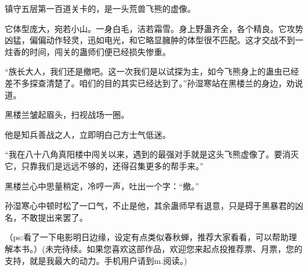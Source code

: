 \begin{this_body}
镇守五层第一百道关卡的，是一头荒兽飞熊的虚像。

它体型庞大，宛若小山。一身白毛，洁若霜雪。身上野蛊齐全，各个精良。它攻势凶猛，偏偏动作轻灵，迅如电光，和它略显臃肿的体型很不匹配。这才交战不到一炷香的时间，闯关的蛊师们便已经损失惨重。

“族长大人，我们还是撤吧。这一次我们是以试探为主，如今飞熊身上的蛊虫已经差不多探查清楚了。咱们的目的其实已经达到了。”孙湿寒站在黑楼兰的身边，劝说道。

黑楼兰皱起眉头，扫视战场一圈。

他是知兵善战之人，立即明白己方士气低迷。

“我在八十八角真阳楼中闯关以来，遇到的最强对手就是这头飞熊虚像了。要消灭它，只靠我们是远远不够的，还得召集更多的帮手来。”

黑楼兰心中思量稍定，冷哼一声，吐出一个字：“撤。”

孙湿寒心中顿时松了一口气，不止是他，其余蛊师早有退意，只是碍于黑暴君的凶名，不敢提出来罢了。

（ps:看了一下电影明日边缘，设定有点类似春秋蝉，推荐大家看看，可以帮助理解本书。）(未完待续。如果您喜欢这部作品，欢迎您来起点投推荐票、月票，您的支持，就是我最大的动力。手机用户请到m.阅读。)

\end{this_body}

